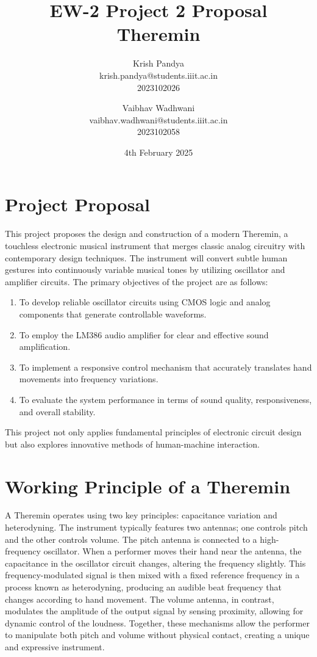 \documentclass{article}
\title{\textbf{EW-2 Project 2 Proposal} \\ Theremin}
\author{Krish Pandya \\ krish.pandya@students.iiit.ac.in \\ 2023102026 
        \and 
        Vaibhav Wadhwani \\ vaibhav.wadhwani@students.iiit.ac.in \\ 2023102058}
\date{4th February 2025}
\numberwithin{equation}{section}
\begin{document}
\maketitle

\section{Project Proposal}
This project proposes the design and construction of a modern Theremin, a touchless electronic musical instrument that merges classic analog circuitry with contemporary design techniques. The instrument will convert subtle human gestures into continuously variable musical tones by utilizing oscillator and amplifier circuits. The primary objectives of the project are as follows:
\begin{enumerate}
    \item To develop reliable oscillator circuits using CMOS logic and analog components that generate controllable waveforms.
    \item To employ the LM386 audio amplifier for clear and effective sound amplification.
    \item To implement a responsive control mechanism that accurately translates hand movements into frequency variations.
    \item To evaluate the system performance in terms of sound quality, responsiveness, and overall stability.
\end{enumerate}
This project not only applies fundamental principles of electronic circuit design but also explores innovative methods of human-machine interaction.

\section{Working Principle of a Theremin}
A Theremin operates using two key principles: capacitance variation and heterodyning. The instrument typically features two antennas; one controls pitch and the other controls volume. The pitch antenna is connected to a high-frequency oscillator. When a performer moves their hand near the antenna, the capacitance in the oscillator circuit changes, altering the frequency slightly. This frequency-modulated signal is then mixed with a fixed reference frequency in a process known as heterodyning, producing an audible beat frequency that changes according to hand movement. The volume antenna, in contrast, modulates the amplitude of the output signal by sensing proximity, allowing for dynamic control of the loudness. Together, these mechanisms allow the performer to manipulate both pitch and volume without physical contact, creating a unique and expressive instrument.
\end{document}
